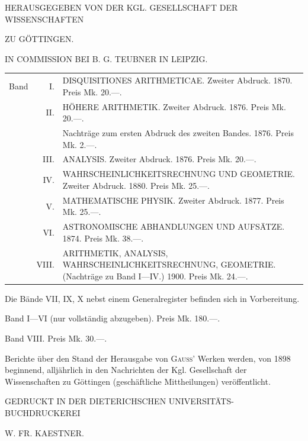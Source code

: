 \clearpage{}
\begin{center}
{\Large{}}\par\medskip
HERAUSGEGEBEN VON DER KGL. GESELLSCHAFT DER WISSENSCHAFTEN\par
ZU GÖTTINGEN.\par\medskip
IN COMMISSION BEI B. G. TEUBNER IN LEIPZIG.
\end{center}

\noindent\begin{tabular}{@{}l@{\quad}r@{\quad}p{.84\linewidth}@{}}
Band&I.&DISQUISITIONES ARITHMETICAE. Zweiter Abdruck. 1870. Preis Mk. 20.—.\\[.3em]
&II.&HÖHERE ARITHMETIK. Zweiter Abdruck. 1876. Preis Mk. 20.—.\\[.3em]
&&Nachträge zum ersten Abdruck des zweiten Bandes. 1876. Preis Mk. 2.—.\\[.3em]
&III.&ANALYSIS. Zweiter Abdruck. 1876. Preis Mk. 20.—.\\[.3em]
&IV.&WAHRSCHEINLICHKEITSRECHNUNG UND GEOMETRIE. Zweiter Abdruck. 1880. Preis Mk. 25.—.\\[.3em]
&V.&MATHEMATISCHE PHYSIK. Zweiter Abdruck. 1877. Preis Mk. 25.—.\\[.3em]
&VI.&ASTRONOMISCHE ABHANDLUNGEN UND AUFSÄTZE. 1874. Preis Mk. 38.—.\\[.3em]
&VIII.&ARITHMETIK, ANALYSIS, WAHRSCHEINLICHKEITSRECHNUNG, GEOMETRIE. (Nachträge zu Band I—IV.) 1900. Preis Mk. 24.—.
\end{tabular}

\medskip\noindent Die Bände VII, IX, X nebst einem Generalregister befinden sich in Vorbereitung.

\noindent Band I—VI (nur vollständig abzugeben). Preis Mk. 180.—.\par
\noindent Band VIII. Preis Mk. 30.—.

\bigskip
Berichte über den Stand der Herausgabe von \textsc{Gauss}' Werken werden, von 1898 beginnend, alljährlich in den Nachrichten der Kgl. Gesellschaft der Wissenschaften zu Göttingen (geschäftliche Mittheilungen) veröffentlicht.

\bigskip\begin{center}
{\large{}}\par\medskip
GEDRUCKT IN DER DIETERICHSCHEN UNIVERSITÄTS-BUCHDRUCKEREI\par\medskip
W. FR. KAESTNER.
\end{center}
